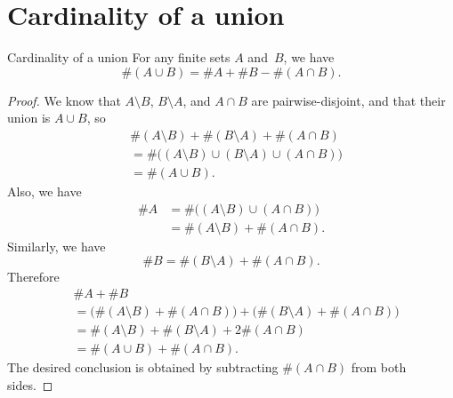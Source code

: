 \documentclass[../MATH-2000-Notes.tex]{subfiles}
\begin{document}
\section{Cardinality of a union}
\begin{Proposition}
    {Cardinality of a union}
    \label{card(AcupB)}
    For any finite sets $A$ and~$B$, we have
    $$ \#(A \cup B) = \#A + \#B - \#(A \cap B) .$$
\end{Proposition}


\begin{proof}
    We know that $A \setminus B$, $B \setminus A$, and $A \cap B$ are pairwise-disjoint, and that their union is $A\cup B$, so
    $$ 
    \begin{aligned}
        &\#(A \setminus B) + \#(B \setminus A) + \# (A \cap B)
        \\&= \# \bigl( (A \setminus B) \cup (B \setminus A) \cup (A \cap B)  \bigr)
        \\&= \# (A \cup B) .
    \end{aligned}
    $$
    Also, we have
    \begin{align*}
        \#A
         & = \# \bigl( (A \setminus B) \cup (A \cap B) \bigr) \\
         & = 	 \#(A \setminus B) + \# (A \cap B)
        .\end{align*}
    Similarly, we have
    $$  \# B = \#(B \setminus A) + \# (A \cap B) .$$
    Therefore
    \begin{align*}
        &\#A + \#B
        \\&= \bigl( \#(A \setminus B) + \# (A \cap B)  \bigr) + \bigl(  \#(B \setminus A) + \# (A \cap B) \bigr)
        \\&=  \#(A \setminus B) + \#(B \setminus A) + 2\# (A \cap B)
        \\&=  \#(A \cup B) + \# (A \cap B)
        .\end{align*}
    The desired conclusion is obtained by subtracting $\# (A \cap B)$ from both sides.
\end{proof}
\end{document}
